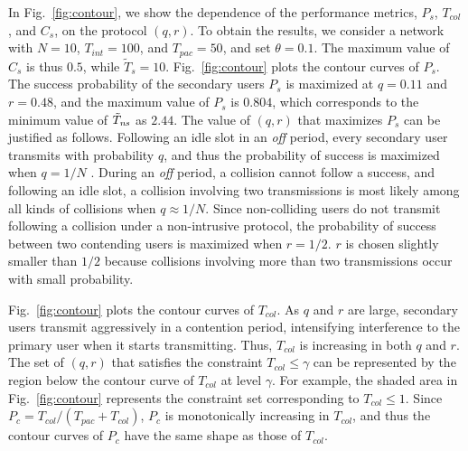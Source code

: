 \documentclass[12pt,draftclsnofoot,onecolumn]{IEEEtran}
\begin{document}
In Fig.~\ref{fig:contour}, we show the dependence of the performance metrics,
$P_s$, $T_{col}$, and $C_s$, on the protocol $(q,r)$. To obtain the results, we consider a network with
$N = 10$, $T_{int} = 100$, and $T_{pac} = 50$, and set $\theta = 0.1$. The maximum value of
$C_s$ is thus $0.5$, while $\tilde{T}_s = 10$.
Fig.~\ref{fig:contour} plots
the contour curves of $P_s$. The success probability of the secondary users $P_s$
is maximized at $q = 0.11$ and $r = 0.48$, and the maximum value
of $P_s$ is $0.804$, which corresponds to the minimum value of $\tilde{T}_{\textrm{\emph{ns}}}$
as $2.44$.
The value of $(q,r)$ that maximizes $P_s$ can be justified as follows. Following an idle slot
in an \emph{off} period, every secondary user transmits with probability $q$, and thus the probability of success
is maximized when $q = 1/N$ \cite{massey}. During an \emph{off} period, a collision cannot follow a success, and
following an idle slot, a collision involving two transmissions is most likely among all kinds of collisions
when $q \approx 1/N$. Since non-colliding users do not transmit following a collision under a non-intrusive protocol,
the probability of success between two contending users is maximized when $r = 1/2$.
$r$ is chosen slightly smaller than $1/2$ because collisions involving
more than two transmissions occur with small probability.

Fig.~\ref{fig:contour} plots the contour curves of $T_{col}$.
As $q$ and $r$ are large, secondary users transmit aggressively in a contention period, intensifying
interference to the primary user when it starts transmitting. Thus, $T_{col}$ is increasing in both $q$ and $r$.
The set of $(q,r)$ that satisfies the constraint $T_{col} \leq \gamma$ can be represented by the region below the
contour curve of $T_{col}$ at level $\gamma$. For example, the shaded area
in Fig.~\ref{fig:contour} represents the constraint set corresponding to $T_{col} \leq 1$.
Since $P_c = T_{col}/(T_{pac}+T_{col})$, $P_c$ is monotonically increasing
in $T_{col}$, and thus the contour curves of $P_c$ have the same shape
as those of $T_{col}$.
\end{document}
